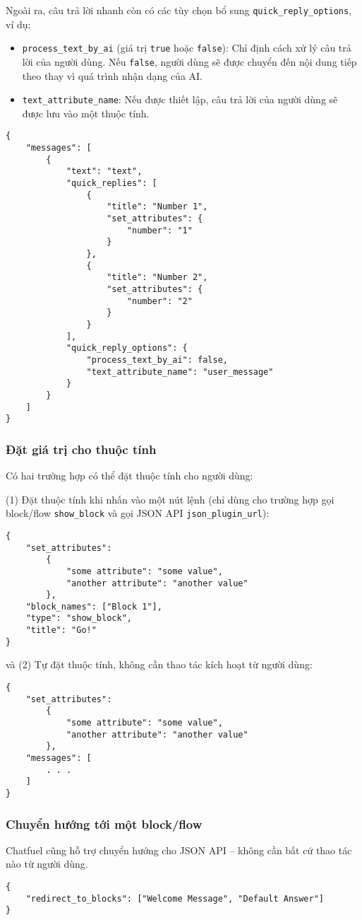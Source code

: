 Ngoài ra, câu trả lời nhanh còn có các tùy chọn bổ sung \texttt{quick\_reply\_options}, ví dụ: \begin{itemize}
\item \texttt{process\_text\_by\_ai} (giá trị \texttt{true} hoặc \texttt{false}): Chỉ định cách xử lý câu trả lời của người dùng. Nếu \texttt{false}, người dùng sẽ được chuyển đến nội dung tiếp theo thay vì quá trình nhận dạng của AI.
\item \texttt{text\_attribute\_name}: Nếu được thiết lập, câu trả lời của người dùng sẽ được lưu vào một thuộc tính.
\end{itemize}\par
\begin{lstlisting}
{
	"messages": [
		{
			"text": "text",
			"quick_replies": [
				{
					"title": "Number 1",
					"set_attributes": {
						"number": "1"
					}
				},
				{
					"title": "Number 2",
					"set_attributes": {
						"number": "2"
					}
				}
			],
			"quick_reply_options": {
				"process_text_by_ai": false,
				"text_attribute_name": "user_message"
			}
		}
	]
}
\end{lstlisting}

\subsubsection{Đặt giá trị cho thuộc tính}
Có hai trường hợp có thể đặt thuộc tính cho người dùng:\par
(1) Đặt thuộc tính khi nhấn vào một nút lệnh (chỉ dùng cho trường hợp gọi block/flow \texttt{show\_block} và gọi JSON API \texttt{json\_plugin\_url}): \begin{lstlisting}
{
	"set_attributes": 
		{
			"some attribute": "some value",
			"another attribute": "another value"
		},
	"block_names": ["Block 1"],
	"type": "show_block",
	"title": "Go!"
}
\end{lstlisting}
và (2) Tự đặt thuộc tính, không cần thao tác kích hoạt từ người dùng:\begin{lstlisting}
{
	"set_attributes":
		{
			"some attribute": "some value",
			"another attribute": "another value"
		},
	"messages": [
		. . .
	]
}
\end{lstlisting}\par

\subsubsection{Chuyển hướng tới một block/flow}
Chatfuel cũng hỗ trợ chuyển hướng cho JSON API – không cần bất cứ thao tác nào từ người dùng.
\begin{lstlisting}
{
	"redirect_to_blocks": ["Welcome Message", "Default Answer"]
}
\end{lstlisting}
